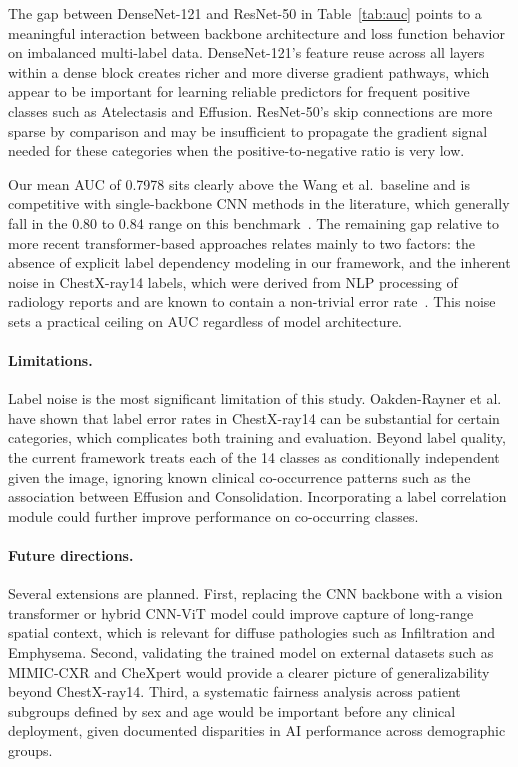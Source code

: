 \documentclass[runningheads]{llncs}
\begin{document}
The gap between DenseNet-121 and ResNet-50 in Table~\ref{tab:auc}
points to a meaningful interaction between backbone architecture
and loss function behavior on imbalanced multi-label data.
DenseNet-121's feature reuse across all layers within a dense
block creates richer and more diverse gradient pathways, which
appear to be important for learning reliable predictors for
frequent positive classes such as Atelectasis and Effusion.
ResNet-50's skip connections are more sparse by comparison and
may be insufficient to propagate the gradient signal needed for
these categories when the positive-to-negative ratio is very low.

Our mean AUC of 0.7978 sits clearly above the Wang et al.\ baseline
and is competitive with single-backbone CNN methods in the
literature, which generally fall in the 0.80 to 0.84 range on
this benchmark~\cite{ma2021vit}. The remaining gap relative to
more recent transformer-based approaches relates mainly to two
factors: the absence of explicit label dependency modeling in our
framework, and the inherent noise in ChestX-ray14 labels, which
were derived from NLP processing of radiology reports and are
known to contain a non-trivial error rate~\cite{oakden2020hidden}.
This noise sets a practical ceiling on AUC regardless of model
architecture.

\paragraph{Limitations.}
Label noise is the most significant limitation of this study.
Oakden-Rayner et al.~\cite{oakden2020hidden} have shown that
label error rates in ChestX-ray14 can be substantial for certain
categories, which complicates both training and evaluation. Beyond
label quality, the current framework treats each of the 14 classes
as conditionally independent given the image, ignoring known
clinical co-occurrence patterns such as the association between
Effusion and Consolidation. Incorporating a label correlation
module could further improve performance on co-occurring classes.

\paragraph{Future directions.}
Several extensions are planned. First, replacing the CNN backbone
with a vision transformer or hybrid CNN-ViT model could improve
capture of long-range spatial context, which is relevant for
diffuse pathologies such as Infiltration and Emphysema. Second,
validating the trained model on external datasets such as MIMIC-CXR
and CheXpert would provide a clearer picture of generalizability
beyond ChestX-ray14. Third, a systematic fairness analysis across
patient subgroups defined by sex and age would be important before
any clinical deployment, given documented disparities in AI
performance across demographic groups.
\end{document}

